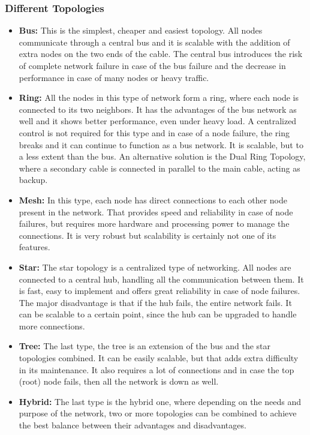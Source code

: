 \subsubsection{Different Topologies}
\begin{itemize}
\item \textbf{Bus:} This is the simplest, cheaper and easiest topology. All nodes communicate through a central bus and it is scalable with the addition of extra nodes on the two ends of the cable. The central bus introduces the risk of complete network failure in case of the bus failure and the decrease in performance in case of many nodes or heavy traffic.
\item \textbf{Ring:} All the nodes in this type of network form a ring, where each node is connected to its two neighbors. It has the advantages of the bus network as well and it shows better performance, even under heavy load. A centralized control is not required for this type and in case of a node failure, the ring breaks and it can continue to function as a bus network. It is scalable, but to a less extent than the bus. An alternative solution is the Dual Ring Topology, where a secondary cable is connected in parallel to the main cable, acting as backup.
\item \textbf{Mesh:} In this type, each node has direct connections to each other node present in the network. That provides speed and reliability in case of node failures, but requires more hardware and processing power to manage the connections. It is very robust but scalability is certainly not one of its features.
\item \textbf{Star:} The star topology is a centralized type of networking. All nodes are connected to a central hub, handling all the communication between them. It is fast, easy to implement and offers great reliability in case of node failures. The major disadvantage is that if the hub fails, the entire network fails. It can be scalable to a certain point, since the hub can be upgraded to handle more connections.
\item \textbf{Tree:} The last type, the tree is an extension of the bus and the star topologies combined. It can be easily scalable, but that adds extra difficulty in its maintenance. It also requires a lot of connections and in case the top (root) node fails, then all the network is down as well.
\item \textbf{Hybrid:} The last type is the hybrid one, where depending on the needs and purpose of the network, two or more topologies can be combined to achieve the best balance between their advantages and disadvantages.
\end{itemize}

